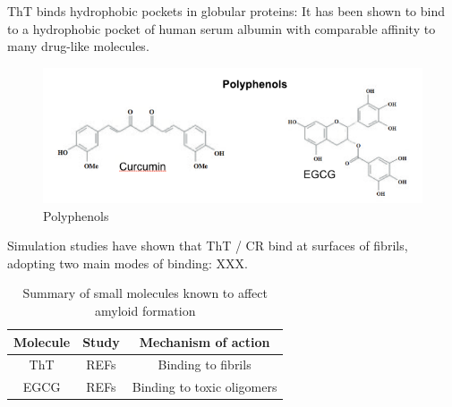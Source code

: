 ThT binds hydrophobic pockets in globular proteins: It has been shown to bind to a hydrophobic pocket of human serum albumin with comparable affinity to many drug-like molecules.\cite{Groenning:2007p3436,Groenning:2007eo}




\begin{figure}
\centering
\includegraphics[width=6in]{figures/introduction/polyphenols.png}
\caption[Small molecule binders]{Polyphenols}
\label{fig:polyphenols}
\end{figure}

Simulation studies have shown that ThT / CR bind at surfaces of fibrils, adopting two main modes of binding: XXX.\cite{XXX I'm thinking of the Chun Wu study from 2007, were there more?}

\begin{table}%
  \begin{center}
  \vspace{10pt}
  \caption{Summary of small molecules known to affect amyloid formation}
  \label{tbl:inhibitors}
    \begin{tabular}{| c | c | c |}
      \hline
      Molecule & Study & Mechanism of action \\
      \hline
      ThT & REFs & Binding to fibrils \\
      EGCG & REFs & Binding to toxic oligomers \\
	  \hline
    \end{tabular}
  \end{center}
\end{table}

